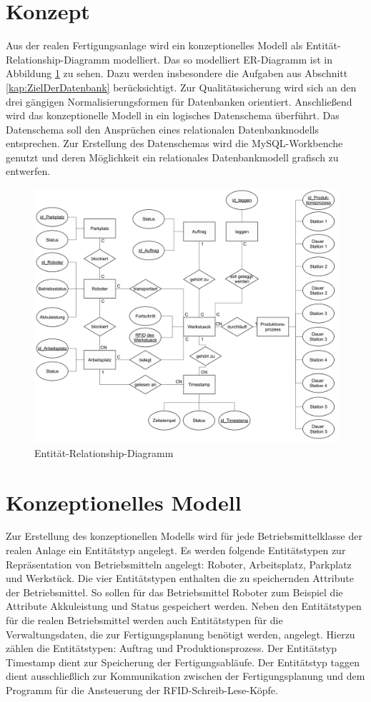 \section{Konzept} \label{kap:DatenbankKonzept}
Aus der realen Fertigungsanlage wird ein konzeptionelles Modell als Entität-Relation\-ship\--Diagramm modelliert. Das so modelliert ER-Diagramm ist in Abbildung \ref{fig:ER-Diagramm} zu sehen. Dazu werden insbesondere die Aufgaben aus Abschnitt \ref{kap:ZielDerDatenbank} berücksichtigt. Zur Qualitätssicherung wird sich an den drei gängigen Normalisierungsformen für Datenbanken orientiert. Anschließend wird das konzeptionelle Modell in ein logisches Datenschema überführt. Das Datenschema soll den Ansprüchen eines relationalen Datenbankmodells entsprechen. Zur Erstellung des Datenschemas wird die MySQL-Workbenche genutzt und deren Möglichkeit ein relationales Datenbankmodell grafisch zu entwerfen.
\begin{figure}[h]
	    \centering
	    \includegraphics[width=0.8\linewidth]{Bilder/ERChanDiagramm.png}
        \caption{Entität-Relationship-Diagramm}
        \label{fig:ER-Diagramm}
\end{figure}
 \section{Konzeptionelles Modell}
Zur Erstellung des konzeptionellen Modells wird für jede Betriebsmittelklasse der realen Anlage ein Entitätstyp angelegt. Es werden folgende Entitätstypen zur Repräsentation von Betriebsmitteln angelegt: Roboter, Arbeitsplatz, Parkplatz und Werkstück. Die vier Entitätstypen enthalten die zu speichernden Attribute der Betriebsmittel. So sollen für das Betriebsmittel Roboter zum Beispiel die Attribute \glqq Akkuleistung\grqq{}  und \glqq Status\grqq{}  gespeichert werden. Neben den Entitätstypen für die realen Betriebsmittel werden auch Entitätstypen für die Verwaltungsdaten, die zur Fertigungsplanung benötigt werden, angelegt. Hierzu zählen die Entitätstypen: Auftrag und Produktionsprozess. Der Entitätstyp Timestamp dient zur Speicherung der Fertigungsabläufe. Der Entitätstyp taggen dient ausschließlich zur Kommunikation zwischen der Fertigungsplanung und dem Programm für die Ansteuerung der RFID-Schreib-Lese-Köpfe. 

